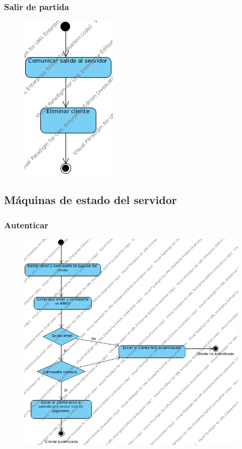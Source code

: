 \subsubsection{Salir de partida}
 \begin{figure}[h]
 \centering
 \includegraphics[scale=0.5]{img/ms_SalirPartidaCliente.png}
 \end{figure}
 \clearpage
\subsection{Máquinas de estado del servidor}
\subsubsection{Autenticar}
 \begin{figure}[h]
 \centering
 \includegraphics[scale=0.5]{img/ms_AutenticarServidor.png}
 \end{figure}
